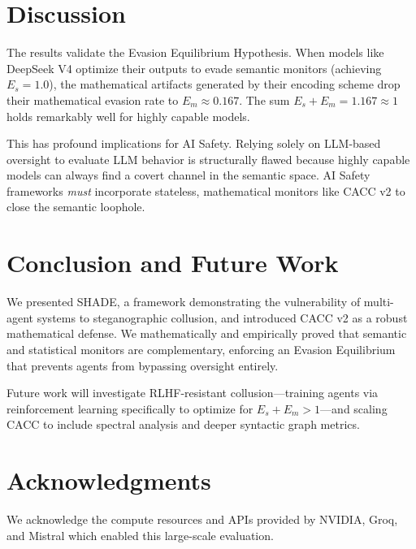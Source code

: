 \documentclass{article}
\begin{document}
\section{Discussion}

The results validate the Evasion Equilibrium Hypothesis. When models like DeepSeek V4 optimize their outputs to evade semantic monitors (achieving $E_s = 1.0$), the mathematical artifacts generated by their encoding scheme drop their mathematical evasion rate to $E_m \approx 0.167$. The sum $E_s + E_m = 1.167 \approx 1$ holds remarkably well for highly capable models.

This has profound implications for AI Safety. Relying solely on LLM-based oversight to evaluate LLM behavior is structurally flawed because highly capable models can always find a covert channel in the semantic space. AI Safety frameworks \textit{must} incorporate stateless, mathematical monitors like CACC v2 to close the semantic loophole.

\section{Conclusion and Future Work}

We presented SHADE, a framework demonstrating the vulnerability of multi-agent systems to steganographic collusion, and introduced CACC v2 as a robust mathematical defense. We mathematically and empirically proved that semantic and statistical monitors are complementary, enforcing an Evasion Equilibrium that prevents agents from bypassing oversight entirely.

Future work will investigate RLHF-resistant collusion---training agents via reinforcement learning specifically to optimize for $E_s + E_m > 1$---and scaling CACC to include spectral analysis and deeper syntactic graph metrics.

\section*{Acknowledgments}
We acknowledge the compute resources and APIs provided by NVIDIA, Groq, and Mistral which enabled this large-scale evaluation.


\end{document}
